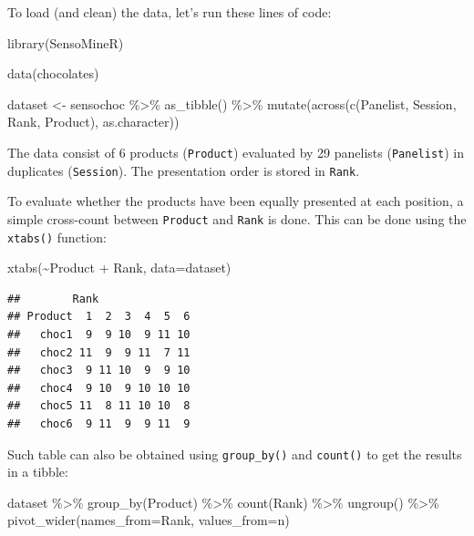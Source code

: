 \documentclass[
]{krantz}
\makeatletter
\newenvironment{Shaded}{\begin{snugshade}}{\end{snugshade}}
\newcommand{\AttributeTok}[1]{\textcolor[rgb]{0.61,0.61,0.61}{#1}}
\newcommand{\FunctionTok}[1]{\textcolor[rgb]{0,0,0}{#1}}
\newcommand{\NormalTok}[1]{#1}
\newcommand{\OtherTok}[1]{\textcolor[rgb]{0.37,0.37,0.37}{#1}}
\newcommand{\SpecialCharTok}[1]{\textcolor[rgb]{0,0,0}{#1}}
\newenvironment{kframe}{%
\medskip{}
\setlength{\fboxsep}{.8em}
 \def\at@end@of@kframe{}%
 \ifinner\ifhmode%
  \def\at@end@of@kframe{\end{minipage}}%
  \begin{minipage}{\columnwidth}%
 \fi\fi%
 \def\FrameCommand##1{\hskip\@totalleftmargin \hskip-\fboxsep
 \colorbox{shadecolor}{##1}\hskip-\fboxsep
     \hskip-\linewidth \hskip-\@totalleftmargin \hskip\columnwidth}%
 \MakeFramed {\advance\hsize-\width
   \@totalleftmargin\z@ \linewidth\hsize
   \@setminipage}}%
 {\par\unskip\endMakeFramed%
 \at@end@of@kframe}
\renewenvironment{Shaded}{\begin{kframe}}{\end{kframe}}
\makeatother
\begin{document}
To load (and clean) the data, let's run these lines of code:

\begin{Shaded}
\begin{Highlighting}[]
\FunctionTok{library}\NormalTok{(SensoMineR)}

\FunctionTok{data}\NormalTok{(chocolates)}

\NormalTok{dataset }\OtherTok{\textless{}{-}}\NormalTok{ sensochoc }\SpecialCharTok{\%\textgreater{}\%} 
  \FunctionTok{as\_tibble}\NormalTok{() }\SpecialCharTok{\%\textgreater{}\%} 
  \FunctionTok{mutate}\NormalTok{(}\FunctionTok{across}\NormalTok{(}\FunctionTok{c}\NormalTok{(Panelist, Session, Rank, Product), as.character))}
\end{Highlighting}
\end{Shaded}

The data consist of 6 products (\texttt{Product}) evaluated by 29 panelists (\texttt{Panelist}) in duplicates (\texttt{Session}). The presentation order is stored in \texttt{Rank}.

To evaluate whether the products have been equally presented at each position, a simple cross-count between \texttt{Product} and \texttt{Rank} is done. This can be done using the \texttt{xtabs()} function:

\begin{Shaded}
\begin{Highlighting}[]
\FunctionTok{xtabs}\NormalTok{(}\SpecialCharTok{\textasciitilde{}}\NormalTok{Product }\SpecialCharTok{+}\NormalTok{ Rank, }\AttributeTok{data=}\NormalTok{dataset)}
\end{Highlighting}
\end{Shaded}

\begin{verbatim}
##        Rank
## Product  1  2  3  4  5  6
##   choc1  9  9 10  9 11 10
##   choc2 11  9  9 11  7 11
##   choc3  9 11 10  9  9 10
##   choc4  9 10  9 10 10 10
##   choc5 11  8 11 10 10  8
##   choc6  9 11  9  9 11  9
\end{verbatim}

Such table can also be obtained using \texttt{group\_by()} and \texttt{count()} to get the results in a tibble:

\begin{Shaded}
\begin{Highlighting}[]
\NormalTok{dataset }\SpecialCharTok{\%\textgreater{}\%} 
  \FunctionTok{group\_by}\NormalTok{(Product) }\SpecialCharTok{\%\textgreater{}\%} 
  \FunctionTok{count}\NormalTok{(Rank) }\SpecialCharTok{\%\textgreater{}\%} 
  \FunctionTok{ungroup}\NormalTok{() }\SpecialCharTok{\%\textgreater{}\%} 
  \FunctionTok{pivot\_wider}\NormalTok{(}\AttributeTok{names\_from=}\NormalTok{Rank, }\AttributeTok{values\_from=}\NormalTok{n)}
\end{Highlighting}
\end{Shaded}
\end{document}
